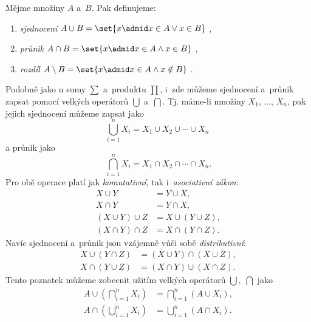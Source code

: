 \begin{definition}\label{def:zakladni_mnozinove_operace}
    Mějme množiny $A$ a~$B$. Pak definujeme:
    \begin{enumerate}[label=(\roman*)]
        \item \emph{sjednocení} $A \cup B=\set{x \admid x \in A \lor x \in B}$ ,
        \item \emph{průnik} $A \cap B=\set{x \admid x \in A \land x \in B}$ ,
        \item \emph{rozdíl} $A \setminus B=\set{x \admid x \in A \land x \notin B}$ .
    \end{enumerate}
\end{definition}

Podobně jako u sumy $\sum$ a~produktu $\prod$, i~zde můžeme sjednocení a~průnik zapsat pomocí velkých operátorů $\bigcup$ a~$\bigcap$. Tj. máme-li množiny $X_1,\,\dots,\,X_n$, pak jejich sjednocení můžeme zapsat jako
\begin{equation*}
    \bigcup\limits_{i=1}^{n}{X_i}=X_1 \cup X_2 \cup \cdots \cup X_n\;
\end{equation*}
a průnik jako
\begin{equation*}
    \bigcap\limits_{i=1}^{n}{X_i}=X_1 \cap X_2 \cap \cdots \cap X_n.
\end{equation*}
Pro obě operace platí jak \emph{komutativní}, tak i~\emph{asociativní zákon}:
\begin{align*}
    X \cup Y&=Y \cup X,\\
    X \cap Y&=Y \cap X,\\
    (X \cup Y) \cup Z &= X \cup (Y \cup Z),\\
    (X \cap Y) \cap Z &= X \cap (Y \cap Z).
\end{align*}
Navíc sjednocení a~průnik jsou vzájemně vůči sobě \emph{distributivní}:
\begin{align*}
    X \cup (Y \cap Z) &= (X \cup Y) \cap (X \cup Z),\\
    X \cap (Y \cup Z) &= (X \cap Y) \cup (X \cap Z).
\end{align*}
Tento poznatek můžeme zobecnit užitím velkých operátorů $\bigcup,\;\bigcap$ jako
\begin{align*}
    A \cup \left(\bigcap\limits_{i=1}^{n}{X_i}\right)&=\bigcap\limits_{i=1}^{n}{(A \cup X_i)},\\
    A \cap \left(\bigcup\limits_{i=1}^{n}{X_i}\right)&=\bigcup\limits_{i=1}^{n}{(A \cap X_i)}.
\end{align*}

